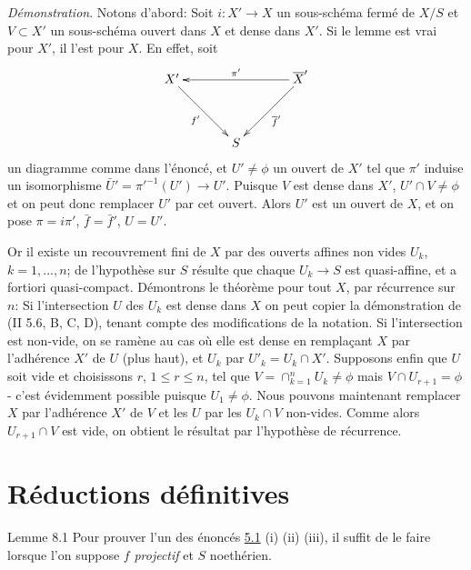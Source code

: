 \documentclass[10pt]{../fichiers-configuration-latex/smfart}
\begin{document}
\noindent
\emph{Démonstration}. Notons d'abord: Soit $i:X'\rightarrow X$ un
sous-schéma fermé de $X/S$ et $V\subset X'$ un sous-schéma ouvert dans
$X$ et dense dans $X'$. Si le lemme est vrai pour $X'$, il l'est pour
$X$. En effet, soit
$$
\xymatrix@=1.25cm{
X' \ar[rd]_{f'}&    &\bar{X}'\ar[ll]_{\pi'}\ar[ld]^{\bar{f}'}\\
  &  S & 
}
$$
un diagramme comme dans l'énoncé, et $U'\neq \phi$ un ouvert de $X'$
tel que $\pi'$ induise un isomorphisme
$\bar{U}'={\pi'}^{-1}(U')\rightarrow U'$. Puisque $V$ est dense dans
$X'$, $U'\cap V\neq \phi$ et on peut donc remplacer $U'$ par cet
ouvert. Alors $U'$ est un ouvert de $X$, et on pose $\pi=i \pi'$,
$\bar{f}=\bar{f}'$, $U=U'$.

Or il existe un recouvrement fini de $X$ par des ouverts affines non
vides $U_k$, $k=1,\ldots,n$; de l'hypothèse sur $S$ résulte que chaque
$U_k\rightarrow S$ est quasi-affine, et a fortiori
quasi-compact. Démontrons le théorème pour tout $X$, par récurrence
sur $n$: Si l'intersection $U$ des $U_k$ est dense dans $X$ on peut
copier la démonstration de (\EGA II 5.6, B, C, D), tenant compte des
modifications de la notation. Si l'intersection est non-vide, on se
ramène au cas où elle est dense en remplaçant $X$ par l'adhérence
$X'$ de $U$ (\cf plus haut), et $U_k$ par $U'_k=U_k\cap X'$. Supposons
enfin que $U$ soit vide et choisissons $r$, $1\leq r\leq n$, tel que
$V=\cap^n_{k=1}U_k\neq \phi$ mais $V\cap U_{r+1}=\phi$ - c'est
évidemment possible puisque $U_1\neq \phi$. Nous pouvons maintenant
remplacer $X$ par l'adhérence $X'$ de $V$ et les $U$ par les $U_k\cap
V$ non-vides. Comme alors $U_{r+1}\cap V$ est vide, on obtient le
résultat par l'hypothèse de récurrence.

\section{Réductions définitives}\pageoriginale

\begin{enonce*}{Lemme 8.1}
Pour prouver l'un des énoncés {\rm \hyperref[XII.thm5.1]{5.1} (i) (ii) (iii)}, il suffit de
le faire lorsque l'on suppose $f$ \emph{projectif} et $S$ noethérien.
\end{enonce*}
\end{document}
